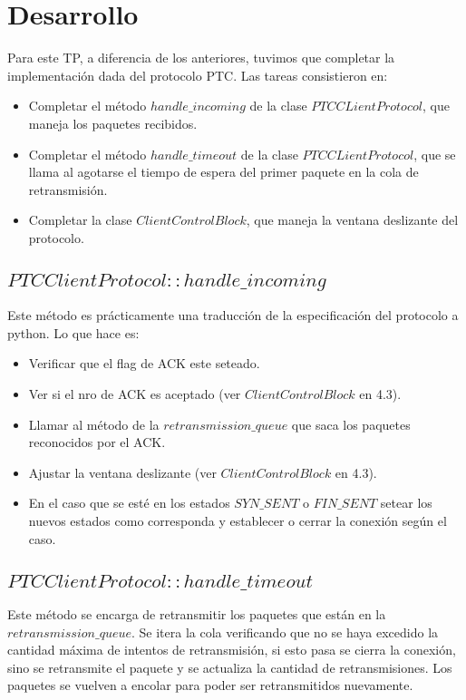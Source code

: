 \newpage
\section{Desarrollo}

\indent Para este TP, a diferencia de los anteriores, tuvimos que completar la implementación dada del protocolo PTC. Las tareas consistieron en:
\begin{itemize}
 \item Completar el método $handle\_incoming$ de la clase $PTCCLientProtocol$, que maneja los paquetes recibidos.
 \item Completar el método $handle\_timeout$ de la clase $PTCCLientProtocol$, que se llama al agotarse el tiempo de espera del primer paquete en la cola de retransmisión.
 \item Completar la clase $ClientControlBlock$, que maneja la ventana deslizante del protocolo.
\end{itemize}

\subsection{$PTCClientProtocol::handle\_incoming$}

\indent Este método es prácticamente una traducción de la especificación del protocolo a python. Lo que hace es:
\begin{itemize}
 \item Verificar que el flag de ACK este seteado.
 \item Ver si el nro de ACK es aceptado (ver $ClientControlBlock$ en 4.3).
 \item Llamar al método de la $retransmission\_queue$ que saca los paquetes reconocidos por el ACK.
 \item Ajustar la ventana deslizante (ver $ClientControlBlock$ en 4.3).
 \item En el caso que se esté en los estados $SYN\_SENT$ o $FIN\_SENT$ setear los nuevos estados como corresponda y establecer o cerrar la conexión según el caso.
\end{itemize}

\subsection{$PTCClientProtocol::handle\_timeout$}

\indent Este método se encarga de retransmitir los paquetes que están en la $retransmission\_queue$. Se itera la cola verificando que no se haya excedido la cantidad máxima de intentos de retransmisión, si esto pasa se cierra la conexión, sino se retransmite el paquete y se actualiza la cantidad de retransmisiones. Los paquetes se vuelven a encolar para poder ser retransmitidos nuevamente.\\

